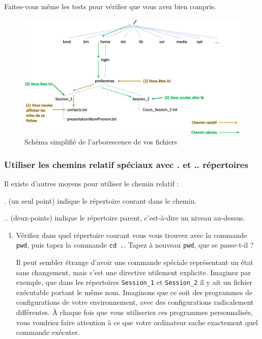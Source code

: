 \documentclass{article}
\begin{document}
\begin{exercice}
\begin{enumerate}
\end{enumerate}

Faites-vous même les tests pour vérifier que vous avez bien compris.

\begin{figure}[h!]
    \begin{center}
    \includegraphics[scale=0.3]{chemin_1.png}
    \caption{Schéma simplifié de l'arborescence de vos fichiers}
     \end{center}
\end{figure}    

\subsubsection*{Utiliser les chemins relatif spéciaux avec . et .. répertoires}\label{Utiliser un chemin relatif avec . et .. répertoires}

Il existe d'autres moyens pour utiliser le chemin relatif :  

    . (un seul point) indique le répertoire courant dans le chemin.    
        
    .. (deux-points) indique le répertoire parent, c'est-à-dire un niveau au-dessus.

\begin{enumerate}

\item
Vérifiez dans quel répertoire courant vous vous trouvez avec la commande \texttt{pwd}, puis tapez la commande  \texttt{cd .}. Tapez à nouveau \texttt{pwd}, que se passe-t-il ? 

Il peut sembler étrange d'avoir une commande spéciale représentant un état sans changement, mais c'est une directive utilement explicite. Imaginez par exemple, que dans les répertoires \texttt{Session\_1} et \texttt{Session\_2} il y ait un fichier exécutable portant le même nom. Imaginons que ce soit des programmes de configurations de votre environnement, avec des configurations radicalement différentes. À chaque fois que vous utiliseriez ces programmes personnalisés, vous voudriez faire attention à ce que votre ordinateur sache exactement quel commande exécuter.


\end{enumerate}
\end{exercice}
\end{document}
